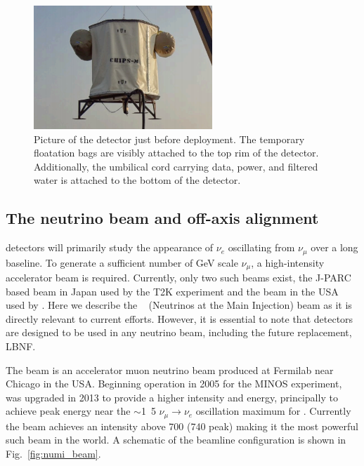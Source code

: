 \begin{figure} %
    \includegraphics[width=0.6\textwidth]{diagrams/4-chips/chips_m.png}
    \caption[Picture of the \chipsm detector.]
    {Picture of the \chipsm detector just before deployment. The temporary floatation bags are
        visibly attached to the top rim of the detector. Additionally, the umbilical cord carrying
        data, power, and filtered water is attached to the bottom of the detector.}
    \label{fig:chips_m}
\end{figure}

\subsection{The neutrino beam and off-axis alignment} %
\label{sec:chips_concept_beam} %

\chips detectors will primarily study the appearance of $\nu_{e}$ oscillating from $\nu_{\mu}$
over a long baseline. To generate a sufficient number of GeV scale $\nu_{\mu}$, a high-intensity
accelerator beam is required. Currently, only two such beams exist, the J-PARC based beam in Japan
used by the T2K experiment and the \numi beam in the USA used by \nova. Here we describe the
\numi~\cite{adamson2016} (Neutrinos at the Main Injection) beam as it is directly relevant to
current \chips efforts. However, it is essential to note that \chips detectors are designed to be
used in any neutrino beam, including the future \numi replacement, LBNF.

The \numi beam is an accelerator muon neutrino beam produced at Fermilab near Chicago in the USA.
Beginning operation in 2005 for the MINOS experiment, \numi was upgraded in 2013 to provide a
higher intensity and energy, principally to achieve peak energy near the $\sim$\unit{1.5}{\GeV}
$\nu_{\mu}\rightarrow\nu_{e}$ oscillation maximum for \nova. Currently the \numi beam achieves an
intensity above \unit{700}{} (\unit{740}{} peak) making it the most powerful
such beam in the world. A schematic of the \numi beamline configuration is shown in
Fig.~\ref{fig:numi_beam}.

